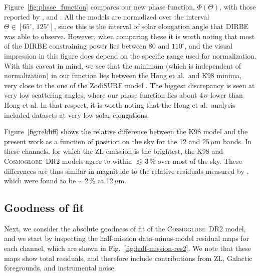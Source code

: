 \documentclass[twocolumn]{aa}
\newcommand{\cosmoglobe}{\textsc{Cosmoglobe}}
\begin{document}
Figure~\ref{fig:phase_function} compares our new phase function, $\Phi(\Theta)$, 
with those reported by \citet{kelsall1998}, \citet{Hong} and \citet{skysurf}. All the models are 
normalized over the interval $\Theta \in [65^\circ,\,125^\circ]$, since this is the interval of 
solar elongation angle that DIRBE was able to observe. However, when comparing these 
it is worth noting that most of the DIRBE constraining power lies between 80 and $110^{\circ}$, 
and the visual impression in this figure does depend on the specific range used for normalization. 
With this caveat in mind, we see that the minimum (which is independent of normalization) 
in our function lies between the Hong et al.\ and K98 minima, very close to the one of 
the ZodiSURF model \citep{skysurf}. The biggest discrepancy is 
seen at very low scattering angles, where our phase function lies about $4\,\sigma$ lower 
than Hong et al. In that respect, it is worth noting that the Hong et al.\ analysis included 
datasets at very low solar elongations. 



Figure~\ref{fig:reldiff} shows the relative difference between the K98 model 
and the present work as a function of position on the sky for the 12 and 25\,$\mu$m
bands. In these channels, for which the ZL emission is the
brightest, the K98 and \cosmoglobe\ DR2 models agree to within
$\lesssim$\,3\,\% over most of the sky. These differences are thus 
similar in magnitude to the relative residuals measured by
\citet{kelsall1998}, which were found to be $\sim$\,2\,\% at
12\,$\mu$m.

\subsection{Goodness of fit}

Next, we consider the absolute goodness of fit of the \cosmoglobe\ DR2
model, and we start by inspecting the half-mission data-minus-model
residual maps for each channel, which are shown in
Fig.~\ref{fig:half-mission-res2}. We note that these maps show total
residuals, and therefore include contributions from ZL, Galactic
foregrounds, and instrumental noise.
\end{document}
